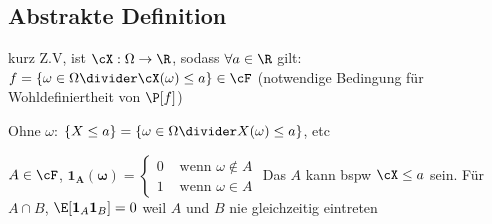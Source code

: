 \subsection{Abstrakte Definition}
\shortdefinition[Zufallsvariable] kurz Z.V, ist $\cX : \Omega \rightarrow \R$, sodass $\forall a \in \R$ gilt:
$f = \{ \omega \in \Omega \divider \cX(\omega) \leq a \} \in \cF$ (notwendige Bedingung für Wohldefiniertheit von $\P[f]$)

\inlinenotation Ohne $\omega$: $\{ X \leq a \} = \{ \omega \in \Omega \divider X(\omega) \leq a \}$, etc

\shortdefinition[Indikatorfunk.] $A \in \cF$, $\bm{1_A(\omega)} = \begin{cases}
        0 & \text{ wenn } \omega \notin A \\
        1 & \text{ wenn } \omega \in A
    \end{cases}$
Das $A$ kann bspw $\cX \leq a$ sein.
Für $A \cap B$, $\E[\bm{1}_A \bm{1}_B] = 0$ weil $A$ und $B$ nie gleichzeitig eintreten
